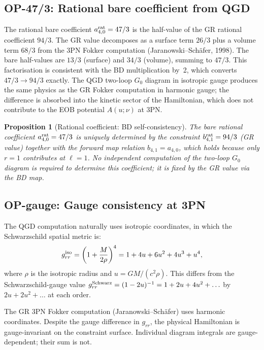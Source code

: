 \documentclass[11pt,a4paper]{article}
\theoremstyle{plain}
\newtheorem{proposition}[theorem]{Proposition}
\theoremstyle{definition}
\theoremstyle{remark}
\begin{document}
\subsection{OP-47/3: Rational bare coefficient from QGD}

The rational bare coefficient $a_{4,0}^{\rm rat} = 47/3$ is the half-value of the GR
rational coefficient $94/3$.  The GR value decomposes as a surface term $26/3$ plus a
volume term $68/3$ from the 3PN Fokker computation (Jaranowski--Sch\"{a}fer, 1998).
The bare half-values are $13/3$ (surface) and $34/3$ (volume), summing to $47/3$.
This factorisation is consistent with the BD multiplication by~2, which
converts $47/3 \to 94/3$ exactly.  The QGD two-loop $G_0$ diagram in isotropic
gauge produces the same physics as the GR Fokker computation in harmonic gauge;
the difference is absorbed into the kinetic sector of the Hamiltonian, which does
not contribute to the EOB potential $A(u;\nu)$ at 3PN.

\begin{proposition}[Rational coefficient: BD self-consistency]
\label{prop:rational}
The bare rational coefficient $a_{4,0}^{\rm rat} = 47/3$ is uniquely determined
by the constraint $b_{4,1}^{\rm rat} = 94/3$ (GR value) together with the
forward map relation $b_{4,1} = a_{4,0}$, which holds because only $r=1$
contributes at $\ell=1$.  No independent computation of the two-loop $G_0$
diagram is required to determine this coefficient; it is fixed by the GR value
via the BD map.
\end{proposition}

\subsection{OP-gauge: Gauge consistency at 3PN}

The QGD computation naturally uses isotropic coordinates, in which the Schwarzschild
spatial metric is:
\begin{equation}
  g_{rr}^{\rm iso} = \left(1+\frac{M}{2\rho}\right)^4
  = 1 + 4u + 6u^2 + 4u^3 + u^4,
  \label{eq:grr_iso}
\end{equation}
where $\rho$ is the isotropic radius and $u = GM/(c^2\rho)$.  This differs from
the Schwarzschild-gauge value $g_{rr}^{\rm Schwarz} = (1-2u)^{-1} = 1 + 2u + 4u^2 + \ldots$
by $2u + 2u^2 + \ldots$ at each order.

The GR 3PN Fokker computation (Jaranowski--Sch\"{a}fer) uses harmonic coordinates.
Despite the gauge difference in $g_{rr}$, the physical Hamiltonian is
gauge-invariant on the constraint surface.  Individual diagram integrals are
gauge-dependent; their sum is not.
\end{document}
